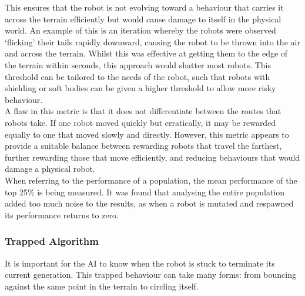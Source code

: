 \documentclass{article}
\begin{document}
This ensures that the robot is not evolving toward a behaviour that carries it across the terrain efficiently but would cause damage to itself in the physical world. An example of this is an iteration whereby the robots were observed ‘flicking’ their tails rapidly downward, causing the robot to be thrown into the air and across the terrain. Whilst this was effective at getting them to the edge of the terrain within seconds, this approach would shatter most robots. This threshold can be tailored to the needs of the robot, such that robots with shielding or soft bodies can be given a higher threshold to allow more risky behaviour.\\

A flaw in this metric is that it does not differentiate between the routes that robots take. If one robot moved quickly but erratically, it may be rewarded equally to one that moved slowly and directly. However, this metric appears to provide a suitable balance between rewarding robots that travel the farthest, further rewarding those that move efficiently, and reducing behaviours that would damage a physical robot. \\

When referring to the performance of a population, the mean performance of the top 25\% is being measured. It was found that analysing the entire population added too much noise to the results, as when a robot is mutated and respawned its performance returns to zero.

\newpage
\subsubsection{Trapped Algorithm}
\label{sec:Trapped Imp}
It is important for the AI to know when the robot is stuck to terminate its current generation. This trapped behaviour can take many forms: from bouncing against the same point in the terrain to circling itself.\\
\end{document}
